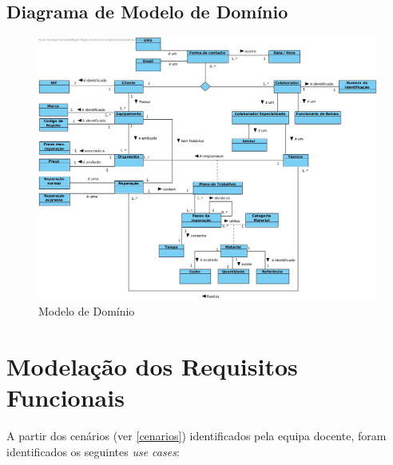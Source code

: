 \documentclass[a4paper,12pt]{scrreprt}
\begin{document}
\section{Diagrama de Modelo de Domínio}

\begin{figure}[!ht]
    \centering
    \includegraphics[scale=0.40]{Modelo.jpg}
    \caption{Modelo de Domínio}
\end{figure}

\chapter{Modelação dos Requisitos Funcionais} \label{modelacao_req_funcionais}

A partir dos cenários (ver \ref{cenarios}) identificados pela equipa docente, 
foram identificados os seguintes \textit{use cases}:
\end{document}
